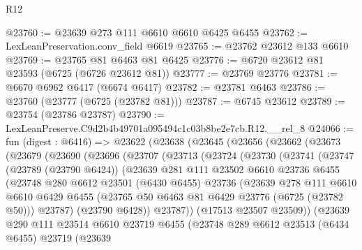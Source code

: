 \begin{lexlean}{R12}
\begin{coremodule}
@23760 := @23639 @273 @111 @6610 @6610 @6425 @6455
@23762 := LexLeanPreservation.conv_field @6619
@23765 := @23762 @23612 @133 @6610
@23769 := @23765 @81 @6463 @81 @6425
@23776 := @6720 @23612 @81 @23593 (@6725 (@6726 @23612 @81))
@23777 := @23769 @23776
@23781 := @6670 @6962 @6417 (@6674 @6417)
@23782 := @23781 @6463
@23786 := @23760 (@23777 (@6725 (@23782 @81)))
@23787 := @6745 @23612
@23789 := @23754 (@23786 @23787)
@23790 := LexLeanPreserve.C9d2b4b49701a095494c1c03b8be2e7cb.R12.__rel_8
@24066 := fun (digest : @6416) =>
  @23622
    (@23638
      (@23645
        (@23656
          (@23662
            (@23673
              (@23679
                (@23690
                  (@23696
                    (@23707
                      (@23713
                        (@23724
                          (@23730
                            (@23741
                              (@23747
                                (@23789 (@23790 @6424))
                                (@23639
                                  @281
                                  @111
                                  @23502
                                  @6610
                                  @23736
                                  @6455
                                  (@23748
                                    @280
                                    @6612
                                    @23501
                                    (@6430 @6455)
                                    @23736
                                    (@23639
                                      @278
                                      @111
                                      @6610
                                      @6610
                                      @6429
                                      @6455
                                      (@23765 @50 @6463 @81 @6429 @23776 (@6725 (@23782 @50)))
                                      @23787)
                                    (@23790 @6428))
                                  @23787))
                              (@17513 @23507 @23509))
                            (@23639
                              @290
                              @111
                              @23514
                              @6610
                              @23719
                              @6455
                              (@23748
                                @289
                                @6612
                                @23513
                                (@6434 @6455)
                                @23719
                                (@23639

\end{coremodule}
\end{lexlean}
